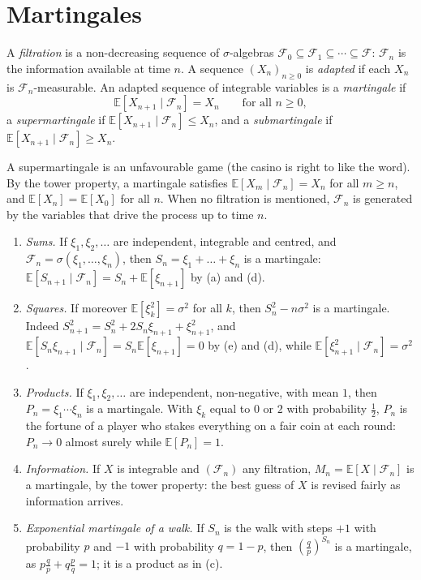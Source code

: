 \section{Martingales}

\begin{definition}\label{def:martingale}
A \emph{filtration} is a non-decreasing sequence of $\sigma$-algebras $\mathcal F_0\subseteq\mathcal F_1\subseteq\cdots\subseteq\mathcal F$: $\mathcal F_n$ is the information available at time
$n$. A sequence $(X_n)_{n\ge0}$ is \emph{adapted} if each $X_n$ is $\mathcal F_n$-measurable. An adapted sequence of integrable variables is
a \emph{martingale} if
\[
\mathbb E[X_{n+1}\mid\mathcal F_n]=X_n\qquad\text{for all }n\ge0,
\]
a \emph{supermartingale} if $\mathbb E[X_{n+1}\mid\mathcal F_n]\le X_n$, and a \emph{submartingale} if $\mathbb E[X_{n+1}\mid\mathcal F_n]\ge X_n$.
\end{definition}

A supermartingale is an unfavourable game (the casino is right to like the word). By the tower property, a
martingale satisfies $\mathbb E[X_m\mid\mathcal F_n]=X_n$ for all $m\ge n$, and $\mathbb E[X_n]=\mathbb E[X_0]$ for all $n$. When no filtration is mentioned, $\mathcal F_n$ is
generated by the variables that drive the process up to time $n$.

\begin{example}\label{ex:martingales}
\begin{enumerate}[label=(\alph*)]
\item \emph{Sums.} If $\xi_1,\xi_2,\ldots$ are independent, integrable and centred, and $\mathcal F_n=\sigma(\xi_1,\dots,\xi_n)$, then $S_n=\xi_1+\dots+\xi_n$ is a
martingale: $\mathbb E[S_{n+1}\mid\mathcal F_n]=S_n+\mathbb E[\xi_{n+1}]$ by (a) and (d).
\item \emph{Squares.} If moreover $\mathbb E[\xi_k^2]=\sigma^2$ for all $k$, then $S_n^2-n\sigma^2$ is a martingale. Indeed
$S_{n+1}^2=S_n^2+2S_n\xi_{n+1}+\xi_{n+1}^2$, and $\mathbb E[S_n\xi_{n+1}\mid\mathcal F_n]=S_n\mathbb E[\xi_{n+1}]=0$ by (e) and (d), while $\mathbb E[\xi_{n+1}^2\mid\mathcal F_n]=\sigma^2$.
\item \emph{Products.} If $\xi_1,\xi_2,\ldots$ are independent, non-negative, with mean $1$, then $P_n=\xi_1\cdots\xi_n$ is a martingale. With $\xi_k$ equal to $0$
or $2$ with probability $\frac12$, $P_n$ is the fortune of a player who stakes everything on a fair coin at each round: $P_n\to0$ almost surely
while $\mathbb E[P_n]=1$.
\item \emph{Information.} If $X$ is integrable and $(\mathcal F_n)$ any filtration, $M_n=\mathbb E[X\mid\mathcal F_n]$ is a martingale, by the tower property: the
best guess of $X$ is revised fairly as information arrives.
\item \emph{Exponential martingale of a walk.} If $S_n$ is the walk with steps $+1$ with probability $p$ and $-1$ with probability $q=1-p$, then
$(\frac qp)^{S_n}$ is a martingale, as $p\frac qp+q\frac pq=1$; it is a product as in (c).
\end{enumerate}
\end{example}


